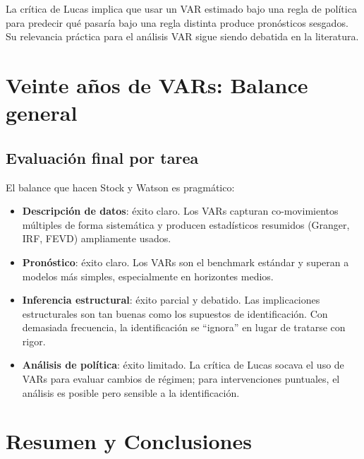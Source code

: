 \documentclass[12pt]{article}
\begin{document}
\begin{hallazgo}
La cr\'itica de Lucas implica que usar un VAR estimado bajo una regla de pol\'itica para predecir qu\'e pasar\'ia bajo una regla distinta produce pron\'osticos sesgados. Su relevancia pr\'actica para el an\'alisis VAR sigue siendo debatida en la literatura.
\end{hallazgo}

\section{Veinte a\~nos de VARs: Balance general}

\subsection{Evaluaci\'on final por tarea}

\begin{intuicion}
El balance que hacen Stock y Watson es pragm\'atico:
\begin{itemize}
  \item \textbf{Descripci\'on de datos}: \'exito claro. Los VARs capturan co-movimientos m\'ultiples de forma sistem\'atica y producen estad\'isticos resumidos (Granger, IRF, FEVD) ampliamente usados.
  \item \textbf{Pron\'ostico}: \'exito claro. Los VARs son el benchmark est\'andar y superan a modelos m\'as simples, especialmente en horizontes medios.
  \item \textbf{Inferencia estructural}: \'exito parcial y debatido. Las implicaciones estructurales son tan buenas como los supuestos de identificaci\'on. Con demasiada frecuencia, la identificaci\'on se ``ignora'' en lugar de tratarse con rigor.
  \item \textbf{An\'alisis de pol\'itica}: \'exito limitado. La cr\'itica de Lucas socava el uso de VARs para evaluar cambios de r\'egimen; para intervenciones puntuales, el an\'alisis es posible pero sensible a la identificaci\'on.
\end{itemize}
\end{intuicion}

\section{Resumen y Conclusiones}
\end{document}
